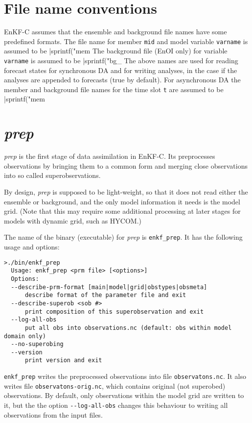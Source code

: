 \documentclass[11pt]{report}
\begin{document}
\section{File name conventions}

EnKF-C assumes that the ensemble and background file names have some predefined formats.
The file name for member \verb|mid| and model variable \verb|varname| is assumed to be \spverb|sprintf("mem%
The background file (EnOI only) for variable \verb|varname| is assumed to be \spverb|sprintf("bg_%
The above names are used for reading forecast states for synchronous DA and for writing analyses, in the case if the analyses are appended to forecasts (true by default).
For asynchronous DA the member and background file names for the time slot \verb|t| are assumed to be \spverb|sprintf("mem%

\section{\emph{prep}}

\emph{prep} is the first stage of data assimilation in EnKF-C.
Its preprocesses observations by bringing them to a common form and merging close observations into so called superobservations.

By design, \emph{prep} is supposed to be light-weight, so that it does not read either the ensemble or background, and the only model information it needs is the model grid. 
(Note that this may require some additional processing at later stages for models with dynamic grid, such as HYCOM.)

The name of the binary (executable) for \emph{prep} is \verb|enkf_prep|.
It has the following usage and options:
\begin{Verbatim}[frame=single,fontsize=\footnotesize]
>./bin/enkf_prep
  Usage: enkf_prep <prm file> [<options>]
  Options:
  --describe-prm-format [main|model|grid|obstypes|obsmeta]
      describe format of the parameter file and exit
  --describe-superob <sob #>
      print composition of this superobservation and exit
  --log-all-obs
      put all obs into observations.nc (default: obs within model domain only)
  --no-superobing
  --version
      print version and exit
\end{Verbatim}

\verb|enkf_prep| writes the preprocessed observations into file \verb|observatons.nc|.
It also writes file \verb|observatons-orig.nc|, which contains original (not superobed) observations.
By default, only observations within the model grid are written to it, but the the option \verb|--log-all-obs| changes this behaviour to writing all observations from the input files.
\end{document}
